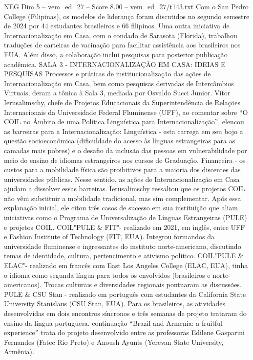 \begin{textsample}{NEG Dim 5 – vem\_ed\_27 – Score 8.00 – vem\_ed\_27/t143.txt}
Com o San Pedro College (Filipinas), os modelos de liderança foram discutidos no segundo semestre de 2024 por 44 estudantes brasileiros e 66 filipinos.
Uma outra iniciativa de Internacionalização em Casa, com o condado de Sarasota (Florida), trabalhou traduções de carteiras de vacinação para facilitar assistência aos brasileiros nos EUA.
Além disso, a colaboração inclui pesquisas para posterior publicação acadêmica.
SALA 3 - INTERNACIONALIZAÇÃO EM CASA: IDEIAS E PESQUISAS Processos e práticas de institucionalização das ações de Internacionalização em Casa, bem como pesquisas derivadas de Intercâmbios Virtuais, deram a tônica à Sala 3, mediada por Osvaldo Succi Junior.
Vitor Ierusalimschy, chefe de Projetos Educacionais da Superintendência de Relações Internacionais da Universidade Federal Fluminense (UFF), ao comentar sobre “O COIL no Âmbito de uma Política Linguística para Internacionalização”, elencou as barreiras para a Internacionalização: Linguística - esta carrega em seu bojo a questão socioeconômica (dificuldade do acesso às línguas estrangeiras para as camadas mais pobres) e o desafio da inclusão das pessoas em vulnerabilidade por meio do ensino de idiomas estrangeiros nos cursos de Graduação.
Financeira - os custos para a mobilidade física são proibitivos para a maioria dos discentes das universidades públicas.
Nesse sentido, as ações de Internacionalização em Casa ajudam a dissolver essas barreiras.
Ierusalimschy ressaltou que os projetos COIL não vêm substituir a mobilidade tradicional, mas sim complementar.
Após essa explanação inicial, ele citou três casos de sucesso em sua instituição que aliam iniciativas como o Programa de Universalização de Línguas Estrangeiras (PULE) e projetos COIL.
COIL"PULE \& FIT"- realizado em 2021, em inglês, entre UFF e Fashion Institute of Technology (FIT, EUA).
Integrou formandos da universidade fluminense e ingressantes do instituto norte-americano, discutindo temas de identidade, cultura, pertencimento e ativismo político.
COIL"PULE \& ELAC"- realizado em francês com East Los Angeles College (ELAC, EUA), tinha o idioma como segunda língua para todos os envolvidos (brasileiros e norte-americanos).
Trocas culturais e diversidades regionais pontuaram as discussões.
PULE \& CSU Stan - realizado em português com estudantes da California State University Stanislaus (CSU Stan, EUA).
Para os brasileiros, as atividades desenvolvidas em dois encontros síncronos e três semanas de projeto trataram do ensino da língua portuguesa. continuação “Brazil and Armenia: a fruitful experience” trata do projeto desenvolvido entre as professoras Edilene Gasparini Fernandes (Fatec Rio Preto) e Anoush Ayunts (Yerevan State University, Armênia).

\end{textsample}
